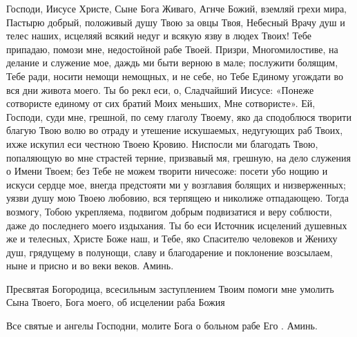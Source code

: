\begin{mymulticols}
 


Господи, Иисусе Христе, Сыне Бога Живаго, Агнче Божий, вземляй грехи мира, Пастырю добрый, положивый душу Твою за овцы Твоя, Небесный Врачу душ и телес наших, исцеляяй всякий недуг и всякую язву в людех Твоих! Тебе припадаю, помози мне, недостойной рабе Твоей. Призри, Многомилостиве, на делание и служение мое, даждь ми быти верною в мале; послужити болящим, Тебе ради, носити немощи немощных, и не себе, но Тебе Единому угождати во вся дни живота моего. Ты бо рекл еси, о, Сладчайший Иисусе: «Понеже сотвористе единому от сих братий Моих меньших, Мне сотвористе». Ей, Господи, суди мне, грешной, по сему глаголу Твоему, яко да сподоблюся творити благую Твою волю во отраду и утешение искушаемых, недугующих раб Твоих, ихже искупил еси честною Твоею Кровию. Ниспосли ми благодать Твою, попаляющую во мне страстей терние, призвавый мя, грешную, на дело служения о Имени Твоем; без Тебе не можем творити ничесоже: посети убо нощию и искуси сердце мое, внегда предстояти ми у возглавия болящих и низверженных; уязви душу мою Твоею любовию, вся терпящею и николиже отпадающею. Тогда возмогу, Тобою укрепляема, подвигом добрым подвизатися и веру соблюсти, даже до последнего моего издыхания. Ты бо еси Источник исцелений душевных же и телесных, Христе Боже наш, и Тебе, яко Спасителю человеков и Жениху душ, грядущему в полунощи, славу и благодарение и поклонение возсылаем, ныне и присно и во веки веков. Аминь. 




\end{mymulticols}

\mychapterending


 


Пресвятая Богородица, всесильным заступлением Твоим помоги мне умолить Сына Твоего, Бога моего, об исцелении раба Божия 


\mychapterending


 


Все святые и ангелы Господни, молите Бога о больном рабе Его . Аминь.


\mychapterending

